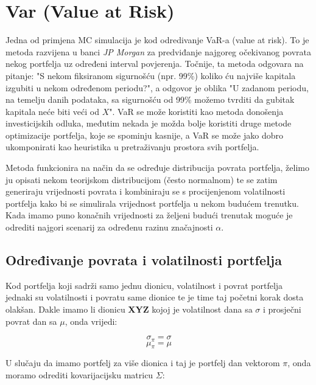 \documentclass[times, utf8, seminar]{fer}
\begin{document}
\section{Var (Value at Risk)}
Jedna od primjena MC simulacija je kod odredivanje VaR-a (value at risk). To je metoda razvijena u banci \emph{JP Morgan} za predviđanje najgoreg očekivanog povrata nekog portfelja uz određeni interval povjerenja. Točnije, ta metoda odgovara na pitanje: "S nekom fiksiranom sigurnošću (npr. 99\%) koliko ću najviše kapitala izgubiti u nekom određenom periodu?", a odgovor je oblika "U zadanom periodu, na temelju danih podataka, sa sigurnošću od 99\% možemo tvrditi da gubitak kapitala neće biti veći od $X$". VaR se može koristiti kao metoda donošenja investicijskih odluka, međutim nekada je možda bolje koristiti druge metode optimizacije portfelja, koje se spominju kasnije, a VaR se može jako dobro ukomponirati kao heuristika u pretraživanju prostora svih portfelja.



Metoda funkcionira na način da se određuje distribucija povrata portfelja, želimo ju opisati nekom teorijskom distribucijom (često normalnom) te se zatim generiraju vrijednosti povrata i kombiniraju se s procijenjenom volatilnosti portfelja kako bi se simulirala vrijednost portfelja u nekom budućem trenutku. Kada imamo puno konačnih vrijednosti za željeni budući trenutak moguće je odrediti najgori scenarij za određenu razinu značajnosti $\alpha$.

\subsection{Određivanje povrata i volatilnosti portfelja}

Kod portfelja koji sadrži samo jednu dionicu, volatilnost i povrat portfelja jednaki su volatilnosti i povratu same dionice te je time taj početni korak dosta olakšan. Dakle imamo li dionicu \textbf{XYZ} kojoj je volatilnost dana sa $\sigma$ i prosječni povrat dan sa $\mu$, onda vrijedi:

\[ \sigma_{\pi} = \sigma \]
\[ \mu_{\pi} = \mu \]

U slučaju da imamo portfelj za više dionica i taj je portfelj dan vektorom \( \pi \), onda moramo odrediti kovarijacijsku matricu \( \Sigma \):
\end{document}
